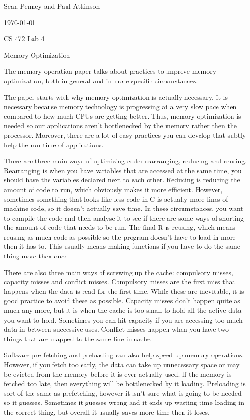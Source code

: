 \documentclass[letterpaper,12pt,titlepage]{article}
\def\name{Sean Penney and Paul Atkinson}
\begin{document}
\hfill \name

\hfill \today

\hfill CS 472 Lab 4


\centerline{\large Memory Optimization}
 
 
The memory operation paper talks about practices to improve memory optimization, both in general and in more specific circumstances.
\newline
\par
The paper starts with why memory optimization is actually necessary. It is necessary because memory technology is progressing at a very
slow pace when compared to how much CPUs are getting better. Thus, memory optimization is needed so our applications aren't bottlenecked 
by the memory rather then the processor. Moreover, there are a lot of easy practices you can develop that subtly help the run time of 
applications.
\newline
\par
There are three main ways of optimizing code: rearranging, reducing and reusing. Rearranging is when you have variables that are accessed 
at the same time, you should have the variables declared next to each other. Reducing is reducing the amount of code to run, which obviously 
makes it more efficient. However, sometimes something that looks like less code in C is actually more lines of machine code, so it doesn't 
actually save time. In these circumstances, you want to compile the code and then analyse it to see if there are some ways of shorting 
the amount of code that needs to be run. The final R is reusing, which means reusing as much code as possible so the program doesn't have 
to load in more then it has to. This usually means making functions if you have to do the same thing more then once.
\newline
\par
There are also three main ways of screwing up the cache: compulsory misses, capacity misses and conflict misses. Compulsory misses are 
the first miss that happens when the data is read for the first time. While these are inevitable, it is good practice to avoid these as 
possible. Capacity misses don't happen quite as much any more, but it is when the cache is too small to hold all the active data you want 
to hold. Sometimes you can hit capacity if you are accessing too much data in-between successive uses. Conflict misses happen when you have 
two things that are mapped to the same line in cache.
\newline
\par
Software pre fetching and preloading can also help speed up memory operations. However, if you fetch too early, the data can take up 
unnecessary space or may be evicted from the memory before it is ever actually used. If the memory is fetched too late, then everything 
will be bottlenecked by it loading. Preloading is sort of the same as prefetching, however it isn't sure what is going to be needed 
so it guesses. Sometimes it guesses wrong and it ends up wasting time loading in the correct thing, but overall it usually saves more 
time then it loses.
\newline
\newline
\newpage
\end{document}
